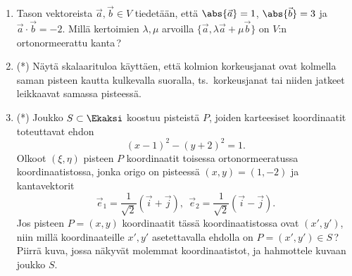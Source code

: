 \begin{enumerate}
\item
Tason vektoreista $\vec a,\vec b \in V$ tiedetään, että $\abs{\vec a}=1$, $\abs{\vec b}=3$ ja
$\vec a\cdot\vec b=-2$. Millä kertoimien $\lambda,\mu$ arvoilla 
$\{\vec a,\lambda\vec a+\mu\vec b\}$ on $V$:n ortonormeerattu kanta\,?

\item (*)
Näytä skalaarituloa käyttäen, että kolmion korkeusjanat ovat kolmella saman pisteen kautta
kulkevalla suoralla, ts.\ korkeusjanat tai niiden jatkeet leikkaavat samassa pisteessä.

\item (*)
Joukko $S\subset\Ekaksi$ koostuu pisteistä $P$, joiden karteesiset koordinaatit toteuttavat
ehdon
\[
(x-1)^2-(y+2)^2=1.
\]
Olkoot $(\xi,\eta)$ pisteen $P$ koordinaatit toisessa ortonormeeratussa koordinaatistossa,
jonka origo on pisteessä $(x,y)=(1,-2)$ ja kantavektorit
\[
\vec e_1=\frac{1}{\sqrt{2}}(\vec i+\vec j),\ \ \vec e_2=\frac{1}{\sqrt{2}}(\vec i-\vec j).
\]
Jos pisteen $P=(x,y)$ koordinaatit tässä koordinaatistossa ovat $(x',y')$, niin millä
koordinaateille $x',y'$ asetettavalla ehdolla on $P=(x',y') \in S\,$? Piirrä kuva, jossa
näkyvät molemmat koordinaatistot, ja hahmottele kuvaan joukko $S$.

\end{enumerate}

